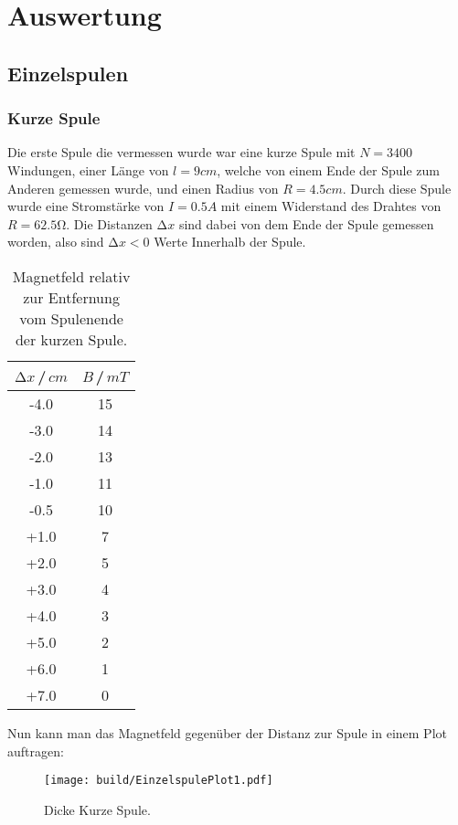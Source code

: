 \section{Auswertung}
\label{sec:Auswertung}
\subsection{Einzelspulen}
    \subsubsection{Kurze Spule}
    Die erste Spule die vermessen wurde war eine kurze Spule mit $N=3400$ Windungen, einer Länge von $l=9\unit{cm}$, welche von einem Ende der Spule zum Anderen gemessen wurde, und einen Radius von $R=4.5\unit{cm}$.
    Durch diese Spule wurde eine Stromstärke von $I=0.5\unit{A}$ mit einem Widerstand des Drahtes von $R=62.5\unit{\ohm}$.
    Die Distanzen $\increment x$ sind dabei von dem Ende der Spule gemessen worden, also sind $\increment x < 0$ Werte Innerhalb der Spule. 
    \begin{table}[H]
        \centering
        \begin{tabular}{c c}
            \toprule
            $\increment x$\,/\,$\unit{cm}$& $B$\,/\,$\unit{mT}$\\
            \midrule
            -4.0  &  15\\
            -3.0  &  14\\
            -2.0  &  13\\
            -1.0  &  11\\
            -0.5  &  10\\
            +1.0  &   7\\
            +2.0  &   5\\
            +3.0  &   4\\
            +4.0  &   3\\
            +5.0  &   2\\
            +6.0  &   1\\
            +7.0  &   0\\
            \bottomrule
        \end{tabular}
        \caption{Magnetfeld relativ zur Entfernung vom Spulenende der kurzen Spule.}
        \label{tab:EinzelSpuleTab1}
    \end{table}
    Nun kann man das Magnetfeld gegenüber der Distanz zur Spule in einem Plot auftragen:
    \begin{figure}[H]
        \centering
        \texttt{[image: build/EinzelspulePlot1.pdf]}
        \caption{Dicke Kurze Spule.}
        \label{fig:EinzelSpulePlot1}
    \end{figure}

